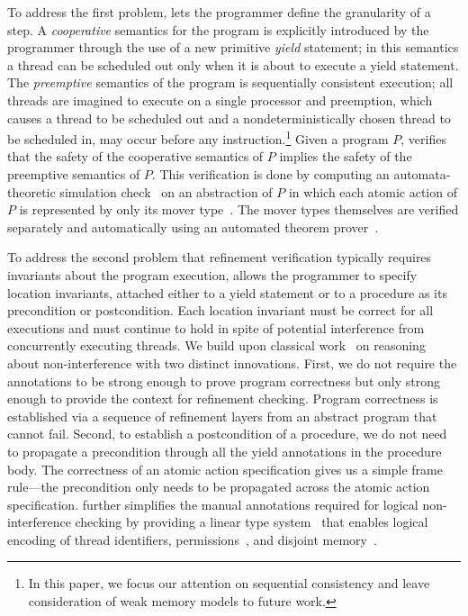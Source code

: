 To address the first problem, \civl lets the programmer define the granularity of a step.
A {\em cooperative\/} semantics for the program is explicitly introduced by the programmer 
through the use of a new primitive {\em yield\/} statement;
in this semantics a thread can be scheduled out only when it is about to execute a yield statement.
The {\em preemptive\/} semantics of the program is sequentially consistent execution; all threads are imagined
to execute on a single processor and preemption, which causes a thread to be scheduled out and a nondeterministically chosen thread to 
be scheduled in, may occur before any instruction.\footnote{In this paper, 
we focus our attention on sequential consistency and leave consideration of weak memory models to future work.}
Given a program $P$, \civl verifies that the safety of the cooperative semantics of $P$ implies the safety of the preemptive semantics of $P$.
This verification is done by computing an automata-theoretic simulation check~\cite{HenzingerHK95} 
on an abstraction of $P$ in which each atomic action of $P$ is represented by only its mover type~\cite{Lipton75,FlanaganFLQ08}. 
The mover types themselves are verified separately and automatically using an automated theorem prover~\cite{MouraB08}.

To address the second problem that refinement verification typically requires invariants about the program execution, 
\civl allows the programmer to specify location invariants, attached either to a yield statement
or to a procedure as its precondition or postcondition.
Each location invariant must be correct for all executions and must continue to hold in spite of potential interference from concurrently executing threads.
We build upon classical work~\cite{OwickiG76,Jones83} on reasoning about non-interference
with two distinct innovations.
First, we do not require the annotations to be strong enough to prove program correctness but only strong enough to provide the context for refinement checking. 
Program correctness is established via a sequence of refinement layers from an abstract program that cannot fail.
Second, to establish a postcondition of a procedure, we do not need to propagate a precondition through all the yield annotations in the procedure body. 
The correctness of an atomic action specification gives us a simple frame rule---the precondition only needs to be propagated across the atomic action specification. 
\civl further simplifies the manual annotations required for logical non-interference checking
by providing a linear type system~\cite{Wadler90lineartypes} that enables logical encoding of thread identifiers, permissions~\cite{boyland:03fractions}, 
and disjoint memory~\cite{LahiriQW11}.



